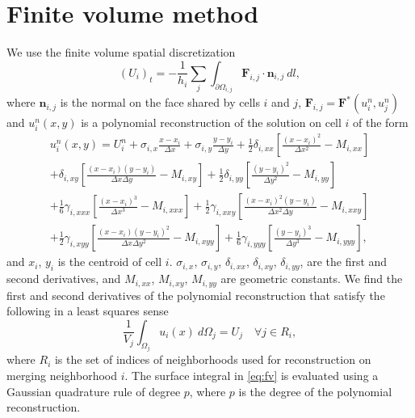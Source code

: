 
\section{Finite volume method}
We use the finite volume spatial discretization 
\begin{equation} \label{eq:fv}
(U_i)_t =  - \frac{1}{h_i}\sum_{j} \int_{\partial \Omega_{i,j}} \mathbf{F}_{i,j} \cdot \mathbf{n}_{i,j}~dl,
\end{equation}
where $\mathbf{n}_{i,j}$ is the normal on the face shared by cells $i$ and $j$, $\mathbf{F}_{i,j} = \mathbf{F}^*(u^n_{i},u^n_{j})$ and $u^n_{i}(x,y)$ is a polynomial reconstruction of the solution on cell $i$ of the form
\begin{equation}\label{eq:u}
\begin{aligned}
	    u^n_i(x,y) = U^n_{i} +  \sigma_{i,x}\frac{x- x_i}{\Delta x} +   \sigma_{i,y}\frac{y- y_i}{\Delta y} + \frac{1}{2} \delta_{i, xx}\left[ \frac{(x -  x_i)^2 }{\Delta x^2} -  M_{i,xx}\right]\\
	    + \delta_{i, xy}\left[ \frac{(x -  x_i) (y -  y_i) }{\Delta x \Delta y} -  M_{i,xy}\right] + \frac{1}{2} \delta_{i, yy}\left[ \frac{(y -  y_i)^2 }{\Delta y^2} -   M_{i,yy}\right]\\
	     + \frac{1}{6}\gamma_{i, xxx}\left[ \frac{(x -  x_i)^3 }{\Delta x^3} -  M_{i,xxx}\right] + \frac{1}{2}\gamma_{i, xxy}\left[ \frac{(x -  x_i)^2 (y -  y_i) }{\Delta x^2 \Delta y} -  M_{i,xxy}\right]\\
	     + \frac{1}{2}\gamma_{i, xyy}\left[ \frac{(x -  x_i) (y -  y_i)^2 }{\Delta x \Delta y ^2} -  M_{i,xyy}\right]+ \frac{1}{6}\gamma_{i, yyy}\left[ \frac{(y -  y_i)^3 }{\Delta y^3} -  M_{i,yyy}\right],
\end{aligned}
\end{equation}
and $ x_i$, $ y_i$ is the centroid of cell $i$. $ \sigma_{i,x}$, $ \sigma_{i,y}$, $ \delta_{i,xx}$, $ \delta_{i,xy}$, $ \delta_{i,yy}$, are the first and second derivatives, and $  M_{i,xx}$, $ M_{i,xy}$,  $ M_{i,yy}$ are geometric constants. We find the first and second derivatives of the polynomial reconstruction that satisfy the following in a least squares sense
\begin{equation}\label{eq:qi}
\frac{1}{ V_j}\int_{\Omega_j} u_i(x)~d\Omega_j = U_j \quad \forall j \in R_i,
\end{equation}
where $R_i$ is the set of indices of neighborhoods used for reconstruction on merging neighborhood $i$.  The surface integral in \eqref{eq:fv} is evaluated using a Gaussian quadrature rule of degree $p$, where $p$ is the degree of the polynomial reconstruction.

